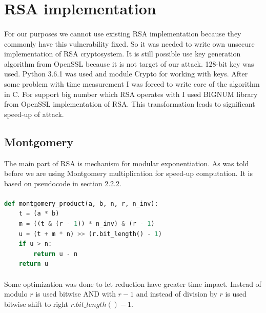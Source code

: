 \documentclass[thesis=B,english]{FITthesis}[2012/10/20]
\begin{document}
{{\section{RSA implementation}

\paragraph*{}{
For our purposes we cannot use existing RSA implementation because they commonly have this vulnerability fixed. So it was needed to write own unsecure implementation of RSA cryptosystem. It is still possible use key generation algorithm from OpenSSL because it is not target of our attack. 128-bit key was used. Python 3.6.1 was used and module Crypto for working with keys. After some problem with time measurement I was forced to write core of the algorithm in C. For support big number which RSA operates with I used BIGNUM library from OpenSSL implementation of RSA. This transformation leads to significant speed-up of attack.
}
\subsection{Montgomery}{
The main part of RSA is mechanism for modular exponentiation. As was told before we are using Montgomery multiplication for speed-up computation. It is based on pseudocode in section 2.2.2.
}
\paragraph*{}
\begin{minipage}{\linewidth}


\begin{lstlisting}[language=Python]
def montgomery_product(a, b, n, r, n_inv):
    t = (a * b)
    m = ((t & (r - 1)) * n_inv) & (r - 1)
    u = (t + m * n) >> (r.bit_length() - 1)
    if u > n:
        return u - n
    return u
\end{lstlisting}

\end{minipage}
\paragraph*{}{
Some optimization was done to let reduction have greater time impact. Instead of modulo \(r\) is used bitwise AND with \(r-1\) and instead of division by \(r\) is used bitwise
shift to right \(r.bit\_length() - 1\).
}

}}
\end{document}
